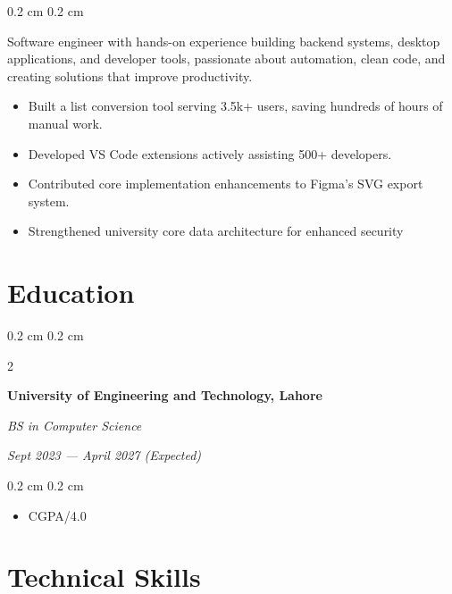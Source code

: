 \documentclass[10pt, a4paper]{article}
\newenvironment{highlights}{
    \begin{itemize}[
        topsep=0.1 cm,
        parsep=0.1 cm,
        partopsep=0pt,
        itemsep=0pt,
        leftmargin=0.4 cm + 10pt
    ]
}{
    \end{itemize}
} %
\newenvironment{onecolentry}{
    \begin{adjustwidth}{
        0.2 cm
    }{
        0.2 cm
    }
}{
    \end{adjustwidth}
} %
\newenvironment{twocolentry}[2][]{
    \onecolentry
    \def\secondColumn{#2}
    \begin{paracol}{2}
}{
    \switchcolumn \raggedleft \secondColumn
    \end{paracol}
    \endonecolentry
} %
\newcommand{\createpointblock}[5]{
    \begin{twocolentry}{
        \textit{#2}

        \textit{#4}}
        \textbf{#1}

        \textit{#3}
    \end{twocolentry}

    \vspace{0.1 cm}
    \begin{onecolentry}
        \begin{highlights}
            #5
        \end{highlights}
    \end{onecolentry}
}
\let\hrefWithoutArrow\href
\renewcommand{\href}[2]{\hrefWithoutArrow{#1}{\ifthenelse{\equal{#2}{}}{}{\textcolor{black}{\uline{#2}}\raisebox{.15ex}{}}}}
\begin{document}
\begin{onecolentry}
    Software engineer with hands-on experience building backend systems, desktop applications, and developer tools, passionate about automation, clean code, and creating solutions that improve productivity.
    \begin{itemize}[parsep=-0.01cm]
        \item Built a list conversion tool serving 3.5k+ users, saving hundreds of hours of manual work.
        \item Developed VS Code extensions actively assisting 500+ developers.
        \item Contributed core implementation enhancements to Figma's SVG export system.
        \item Strengthened university core data architecture for enhanced security
    \end{itemize}
\end{onecolentry}



\section{Education}

\createpointblock{University of Engineering and Technology, Lahore}{Sept 2023 — April 2027 (Expected)}{BS in Computer Science}{}
{%
    \item CGPA\: 3.51/4.0
}

\sloppy %

\section{Technical Skills}
\end{document}
